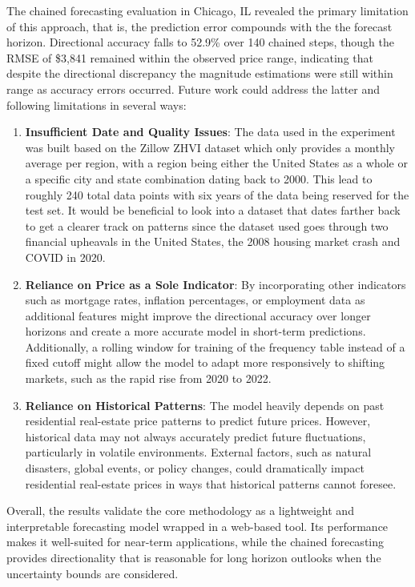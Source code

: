 \documentclass{article}
\begin{document}
The chained forecasting evaluation in Chicago, IL revealed the primary limitation of this approach, that is, the prediction error compounds with the the forecast horizon. Directional accuracy falls to 52.9\% over 140 chained steps, though the RMSE of \$3,841 remained within the observed price range, indicating that despite the directional discrepancy the magnitude estimations were still within range as accuracy errors occurred. Future work could address the latter and following limitations in several ways:

\begin{enumerate}
    \item \textbf{Insufficient Date and Quality Issues}: The data used in the experiment was built based on the Zillow ZHVI dataset which only provides a monthly average per region, with a region being either the United States as a whole or a specific city and state combination dating back to 2000. This lead to roughly 240 total data points with six years of the data being reserved for the test set. It would be beneficial to look into a dataset that dates farther back to get a clearer track on patterns since the dataset used goes through two financial upheavals in the United States, the 2008 housing market crash and COVID in 2020. 
    
    \item \textbf{Reliance on Price as a Sole Indicator}: By incorporating other indicators such as mortgage rates, inflation percentages, or employment data as additional features might improve the directional accuracy over longer horizons and create a more accurate model in short-term predictions. Additionally, a rolling window for training of the frequency table instead of a fixed cutoff might allow the model to adapt more responsively to shifting markets, such as the rapid rise from 2020 to 2022.

    \item  \textbf{Reliance on Historical Patterns}: The model heavily depends on past residential real-estate price patterns to predict future prices. However, historical data may not always accurately predict future fluctuations, particularly in volatile environments. External factors, such as natural disasters, global events, or policy changes, could dramatically impact residential real-estate prices in ways that historical patterns cannot foresee.
    
\end{enumerate}
Overall, the results validate the core methodology as a lightweight and interpretable forecasting model wrapped in a web-based tool. Its performance makes it well-suited for near-term applications, while the chained forecasting provides directionality that is reasonable for long horizon outlooks when the uncertainty bounds are considered.
\end{document}
